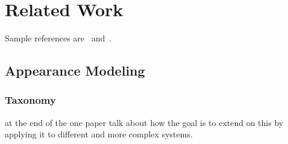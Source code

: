 \setcounter{chapter}{1}

\chapter{Related Work}

Sample references are~\cite{Zwicker04Perspective} and~\cite{Altman89QuaternionScandal}.

\section{Appearance Modeling}




\subsection{Taxonomy}



at the end of the one paper talk about how the goal is to extend on this by applying it to different and more complex systems.



